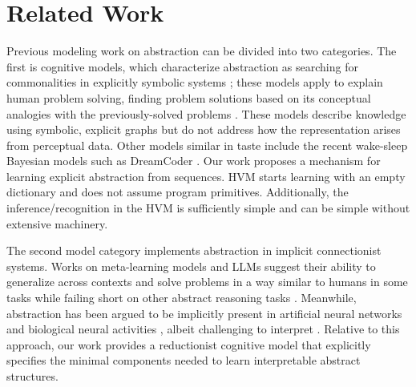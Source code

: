 \documentclass{article} %
\theoremstyle{remark}
\begin{document}
\section{Related Work}
Previous modeling work on abstraction can be divided into two categories. The first is cognitive models, which characterize abstraction as searching for commonalities in explicitly symbolic systems \citep{lu_probabilistic_2021}; these models apply to explain human problem solving, finding problem solutions based on its conceptual analogies with the previously-solved problems \citep{HofstadterMitchell1994}. These models describe knowledge using symbolic, explicit graphs but do not address how the representation arises from perceptual data. Other models similar in taste include the recent wake-sleep Bayesian models such as DreamCoder \cite{ellis2021dreamcoder}. Our work proposes a mechanism for learning explicit abstraction from sequences. HVM starts learning with an empty dictionary and does not assume program primitives. Additionally, the inference/recognition in the HVM is sufficiently simple and can be simple without extensive machinery.

The second model category implements abstraction in implicit connectionist systems. Works on meta-learning models and LLMs suggest their ability to generalize across contexts and solve problems in a way similar to humans in some tasks \citep{wei2022emergent, Binz2023} while failing short on other abstract reasoning tasks \citep{Fleuret2011}. Meanwhile, abstraction has been argued to be implicitly present in artificial neural networks \citep{yee_abstraction_2019,Kozma18, JohnstonFusi2023,Ito2022} and biological neural activities  \citep{bernardi2020geometry,goudar2023schema}, albeit challenging to interpret \citep{fan2021}. Relative to this approach, our work provides a reductionist cognitive model that explicitly specifies the minimal components needed to learn interpretable abstract structures. 
\end{document}
